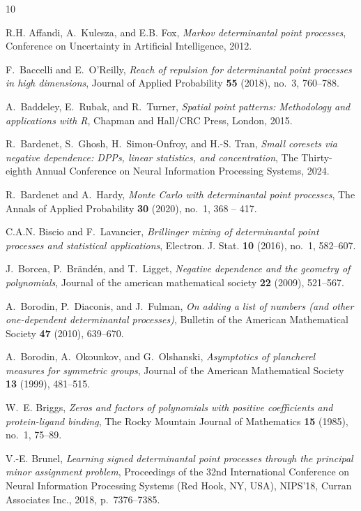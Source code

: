 \documentclass{article}
\numberwithin{equation}{section}
\theoremstyle{plain}
\begin{document}
\begin{thebibliography}{10}

R.H. Affandi, A.~Kulesza, and E.B. Fox, \emph{Markov determinantal point
  processes}, Conference on Uncertainty in Artificial Intelligence, 2012.

F.~Baccelli and E.~O'Reilly, \emph{Reach of repulsion for determinantal point
  processes in high dimensions}, Journal of Applied Probability \textbf{55}
  (2018), no.~3, 760--788.

A.~Baddeley, E.~Rubak, and R.~Turner, \emph{Spatial point patterns: Methodology
  and applications with {R}}, Chapman and Hall/CRC Press, London, 2015.

R.~Bardenet, S.~Ghosh, H.~Simon-Onfroy, and H.-S. Tran, \emph{Small coresets
  via negative dependence: {DPP}s, linear statistics, and concentration}, The
  Thirty-eighth Annual Conference on Neural Information Processing Systems,
  2024.

R.~Bardenet and A.~Hardy, \emph{{Monte Carlo with determinantal point
  processes}}, The Annals of Applied Probability \textbf{30} (2020), no.~1, 368
  -- 417.

C.A.N. Biscio and F.~Lavancier, \emph{Brillinger mixing of determinantal point
  processes and statistical applications}, Electron. J. Stat. \textbf{10}
  (2016), no.~1, 582--607.

J.~Borcea, P.~Brändén, and T.~Ligget, \emph{Negative dependence and the
  geometry of polynomials}, Journal of the american mathematical society
  \textbf{22} (2009), 521--567.

A.~Borodin, P.~Diaconis, and J.~Fulman, \emph{On adding a list of numbers (and
  other one-dependent determinantal processes)}, Bulletin of the American
  Mathematical Society \textbf{47} (2010), 639--670.

A.~Borodin, A.~Okounkov, and G.~Olshanski, \emph{Asymptotics of plancherel
  measures for symmetric groups}, Journal of the American Mathematical Society
  \textbf{13} (1999), 481--515.

W.~E. Briggs, \emph{Zeros and factors of polynomials with positive coefficients
  and protein-ligand binding}, The Rocky Mountain Journal of Mathematics
  \textbf{15} (1985), no.~1, 75--89.

V.-E. Brunel, \emph{Learning signed determinantal point processes through the
  principal minor assignment problem}, Proceedings of the 32nd International
  Conference on Neural Information Processing Systems (Red Hook, NY, USA),
  NIPS'18, Curran Associates Inc., 2018, p.~7376–7385.


\end{thebibliography}
\end{document}
